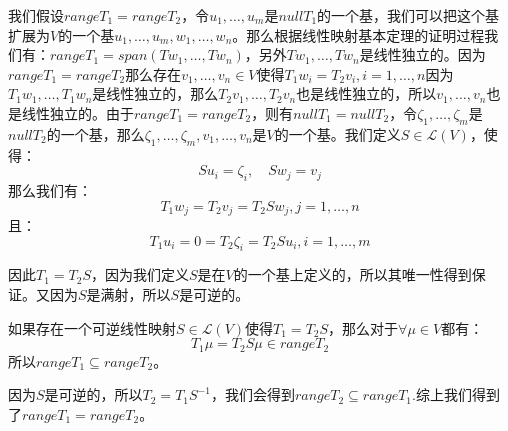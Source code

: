 \documentclass[10pt,a4paper,UTF8]{article}
\begin{document}
\begin{answer}
我们假设\(rangeT_{1} = rangeT_{2}\)，令\(u_{1},\ldots ,u_{m}\)是\(nullT_{1}\)的一个基，我们可以把这个基扩展为\(V\)的一个基\(u_{1},\ldots ,u_{m},w_{1},\ldots ,w_{n}\)。那么根据线性映射基本定理的证明过程我们有：\(rangeT_{1}=span(Tw_{1},\ldots ,Tw_{n})\)，另外\(Tw_{1},\ldots ,Tw_{n}\)是线性独立的。因为\(rangeT_{1} = rangeT_{2}\)那么存在\(v_{1},\ldots ,v_{n}\in V\)使得\(T_{1}w_{i} = T_{2}v_{i},i= 1,\ldots ,n\)因为\(T_{1}w_{1},\ldots ,T_{1}w_{n}\)是线性独立的，那么\(T_{2}v_{1},\ldots ,T_{2}v_{n}\)也是线性独立的，所以\(v_{1},\ldots ,v_{n}\)也是线性独立的。由于\(rangeT_{1} = rangeT_{2}\)，则有\(nullT_{1} = nullT_{2}\)，令\(\zeta_{1},\ldots ,\zeta_{m}\)是\(nullT_{2}\)的一个基，那么\(\zeta_{1},\ldots ,\zeta_{m},v_{1},\ldots ,v_{n}\)是\(V\)的一个基。我们定义\(S\in \mathcal{L}(V)\)，使得：
\begin{equation}
\label{eq:13}
Su_{i} = \zeta_{i} , \quad Sw_{j} = v_{j}
\end{equation}
那么我们有：
\begin{equation}
\label{eq:14}
T_{1}w_{j} = T_{2}v_{j} = T_{2}Sw_{j}, j = 1,\ldots ,n
\end{equation}
且：
\begin{equation}
\label{eq:15}
T_{1}u_{i} = 0 = T_{2}\zeta_{i} = T_{2}Su_{i} , i = 1,\ldots ,m
\end{equation}

因此\(T_{1} = T_{2}S\)，因为我们定义\(S\)是在\(V\)的一个基上定义的，所以其唯一性得到保证。又因为\(S\)是满射，所以\(S\)是可逆的。

如果存在一个可逆线性映射\(S\in \mathcal{L}(V)\)使得\(T_{1} = T_{2}S\)，那么对于\(\forall \mu \in V\)都有：
\begin{equation}
\label{eq:16}
T_{1}\mu = T_{2}S\mu \in range T_{2}
\end{equation}
所以\(rangeT_{1} \subseteq rangeT_{2}\)。

因为\(S\)是可逆的，所以\(T_{2}= T_{1}S^{-1}\)，我们会得到\(rangeT_{2} \subseteq rangeT_{1}\).综上我们得到了\(rangeT_{1} = rangeT_{2}\)。


\end{answer}
\end{document}
